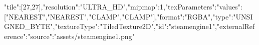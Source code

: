 {"tile":[27,27],"resolution":"ULTRA_HD","mipmap":1,"texParameters":{"values":["NEAREST","NEAREST","CLAMP","CLAMP"]},"format":"RGBA","type":"UNSIGNED_BYTE","textureType":"TiledTexture2D","id":"steamengine1","externalReference":{"source":"assets/steamengine1.png"}}